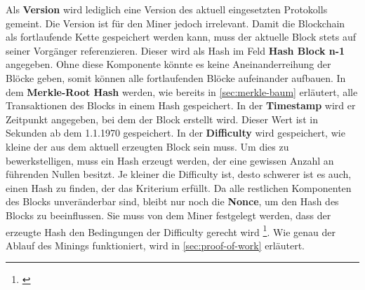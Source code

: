 Als \textbf{Version} wird lediglich eine Version des aktuell eingesetzten Protokolls gemeint. Die Version ist für den Miner jedoch irrelevant.
Damit die Blockchain als fortlaufende Kette gespeichert werden kann, muss der aktuelle Block stets auf seiner Vorgänger referenzieren. Dieser wird als Hash im Feld \textbf{Hash Block n-1} angegeben. Ohne diese Komponente könnte es keine Aneinanderreihung der Blöcke geben, somit können alle fortlaufenden Blöcke aufeinander aufbauen.
In dem \textbf{Merkle-Root Hash} werden, wie bereits in \cref{sec:merkle-baum} erläutert, alle Transaktionen des Blocks in einem Hash gespeichert. In der \textbf{Timestamp} wird er Zeitpunkt angegeben, bei dem der Block erstellt wird. Dieser Wert ist in Sekunden ab dem 1.1.1970 gespeichert.
In der \textbf{Difficulty} wird gespeichert, wie kleine der aus dem aktuell erzeugten Block sein muss. Um dies zu bewerkstelligen, muss ein Hash erzeugt werden, der eine gewissen Anzahl an führenden Nullen besitzt. Je kleiner die Difficulty ist, desto schwerer ist es auch, einen Hash zu finden, der das Kriterium erfüllt. 
Da alle restlichen Komponenten des Blocks unveränderbar sind, bleibt nur noch die \textbf{Nonce}, um den Hash des Blocks zu beeinflussen. Sie muss von dem Miner festgelegt werden, dass der erzeugte Hash den Bedingungen der Difficulty gerecht wird \footnote{\parencite[vgl.][]{Vidrih.29.12.2018}}. Wie genau der Ablauf des Minings funktioniert, wird in \vref{sec:proof-of-work} erläutert.

